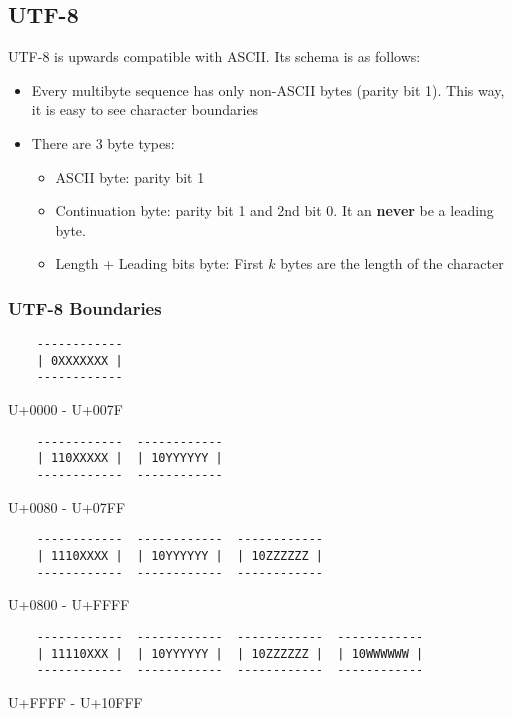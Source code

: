 \documentclass[13pt]{article}
\begin{document}
\subsection{UTF-8}
UTF-8 is upwards compatible with ASCII. Its schema is as follows:
\begin{itemize}[label=]
\item Every multibyte sequence has only non-ASCII bytes (parity bit 1). This way, it is easy to see character boundaries
\item There are 3 byte types:
  \begin{itemize}[label=]
  \item ASCII byte: parity bit 1
  \item Continuation byte: parity bit 1 and 2nd bit 0. It an \textbf{never} be a leading byte.
  \item Length + Leading bits byte: First $k$ bytes are the length of the character
  \end{itemize}
\end{itemize}

\subsubsection*{UTF-8 Boundaries}
\begin{verbatim}
    ------------
    | 0XXXXXXX |
    ------------
\end{verbatim}
U+0000 - U+007F
\begin{verbatim}
    ------------  ------------
    | 110XXXXX |  | 10YYYYYY |
    ------------  ------------
\end{verbatim}
U+0080 - U+07FF
\begin{verbatim}
    ------------  ------------  ------------
    | 1110XXXX |  | 10YYYYYY |  | 10ZZZZZZ |
    ------------  ------------  ------------
\end{verbatim}
U+0800 - U+FFFF
\begin{verbatim}
    ------------  ------------  ------------  ------------
    | 11110XXX |  | 10YYYYYY |  | 10ZZZZZZ |  | 10WWWWWW |
    ------------  ------------  ------------  ------------
\end{verbatim}
U+FFFF - U+10FFF
\end{document}
